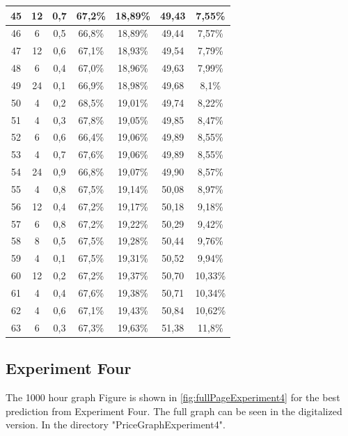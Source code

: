 \begin{longtable}{|c|c|c|c|c|c|c|}
45 & 12 & 0,7 &  67,2\% & 18,89\% & 49,43 & 7,55\% \\ \hline
46 & 6 & 0,5 &  66,8\% & 18,89\% & 49,44 & 7,57\% \\ \hline
47 & 12 & 0,6 &  67,1\% & 18,93\% & 49,54 & 7,79\% \\ \hline
48 & 6 & 0,4 &  67,0\% & 18,96\% & 49,63 & 7,99\% \\ \hline
49 & 24 & 0,1 &  66,9\% & 18,98\% & 49,68 & 8,1\% \\ \hline
50 & 4 & 0,2 &  68,5\% & 19,01\% & 49,74 & 8,22\% \\ \hline
51 & 4 & 0,3 &  67,8\% & 19,05\% & 49,85 & 8,47\% \\ \hline
52 & 6 & 0,6 &  66,4\% & 19,06\% & 49,89 & 8,55\% \\ \hline
53 & 4 & 0,7 &  67,6\% & 19,06\% & 49,89 & 8,55\% \\ \hline
54 & 24 & 0,9 &  66,8\% & 19,07\% & 49,90 & 8,57\% \\ \hline
55 & 4 & 0,8 &  67,5\% & 19,14\% & 50,08 & 8,97\% \\ \hline
56 & 12 & 0,4 &  67,2\% & 19,17\% & 50,18 & 9,18\% \\ \hline
57 & 6 & 0,8 &  67,2\% & 19,22\% & 50,29 & 9,42\% \\ \hline
58 & 8 & 0,5 &  67,5\% & 19,28\% & 50,44 & 9,76\% \\ \hline
59 & 4 & 0,1 &  67,5\% & 19,31\% & 50,52 & 9,94\% \\ \hline
60 & 12 & 0,2 &  67,2\% & 19,37\% & 50,70 & 10,33\% \\ \hline
61 & 4 & 0,4 &  67,6\% & 19,38\% & 50,71 & 10,34\% \\ \hline
62 & 4 & 0,6 &  67,1\% & 19,43\% & 50,84 & 10,62\% \\ \hline
63 & 6 & 0,3 &  67,3\% & 19,63\% & 51,38 & 11,8\% \\ \hline
	\end{longtable}
\normalsize


\subsection{Experiment Four}
The 1000 hour graph Figure is shown in \ref{fig:fullPageExperiment4} for the best prediction from Experiment Four. The full graph can be seen in the digitalized version. In the directory "PriceGraphExperiment4".

